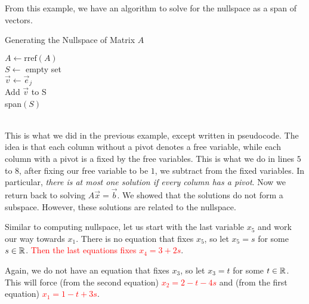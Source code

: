 From this example, we have an algorithm to solve for the nullspace as a span of vectors.
\begin{algorithm}
\caption{Generating the Nullspace of Matrix $A$}

	$A\gets \textrm{rref}(A)$\\
	 $S\gets$ empty set\\
	 {
		 $\vec{v} \gets \vec{e}_j$\\
		Add $\vec{v}$ to S\\
	 }
	\Return span$(S)$
\end{algorithm}
\\
This is what we did in the previous example, except written in pseudocode.
The idea is that each column without a pivot denotes a free variable, while each column with a pivot is a fixed by the free variables.
This is what we do in lines $5$ to $8$, after fixing our free variable to be $1$, we subtract from the fixed variables. 
In particular,\textit{ there is at most one solution if every column has a pivot}.
Now we return back to solving $A\vec{x}=\vec{b}$. We showed that the solutions do not form a subspace. However, these solutions are related to the nullspace.

Similar to computing nullspace, let us start with the last variable $x_5$ and work our way towards $x_1$.
There is no equation that fixes $x_5$, so let $x_5 = s$ for some $s\in\mathbb{R}$.
\textcolor{red}{Then the last equations fixes $x_4 = 3+2s$}. 

Again, we do not have an equation that fixes $x_3$, so let $x_3=t$ for some $t\in\mathbb{R}$.
This will force (from the second equation) \textcolor{red}{$x_2= 2-t-4s$} and (from the first equation) \textcolor{red}{$x_1 = 1-t+3s$}.

